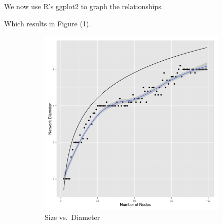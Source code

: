 \documentclass[10pt]{article}
\begin{document}
\begin{easylist}[enumerate]
    

    We now use {\ttfamily R}'s {\ttfamily ggplot2} to graph the relationships.

    

    Which results in Figure (1).

    \begin{figure}[ht]
        \centering
        \begin{subfigure}[b]{0.48\textwidth}
            \includegraphics[scale=0.35]{./img/sizevsdiameter.png}
            \caption{Size vs.\ Diameter}
        \end{subfigure}
        \begin{subfigure}[b]{0.48\textwidth}

\end{subfigure}
\end{figure}
\end{easylist}
\end{document}
